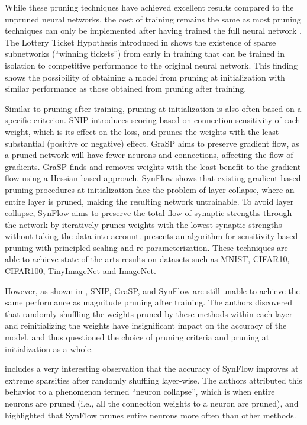 While these pruning techniques have achieved excellent results compared to the unpruned neural networks, the cost of training remains the same as most pruning techniques can only be implemented after having trained the full neural network \autocite{hayou21}. The Lottery Ticket Hypothesis introduced in \textcite{frankle19} shows the existence of sparse subnetworks (``winning tickets'') from early in training that can be trained in isolation to competitive performance to the original neural network. This finding shows the possibility of obtaining a model from pruning at initialization with similar performance as those obtained from pruning after training.

Similar to pruning after training, pruning at initialization is also often based on a specific criterion. SNIP \autocite{snip19} introduces scoring based on connection sensitivity of each weight, which is its effect on the loss, and prunes the weights with the least substantial (positive or negative) effect. GraSP \autocite{grasp20} aims to preserve gradient flow, as a pruned network will have fewer neurons and connections, affecting the flow of gradients. GraSP finds and removes weights with the least benefit to the gradient flow using a Hessian based approach. SynFlow \autocite{synflow20} shows that existing gradient-based pruning procedures at initialization face the problem of layer collapse, where an entire layer is pruned, making the resulting network untrainable. To avoid layer collapse, SynFlow aims to preserve the total flow of synaptic strengths through the network by iteratively prunes weights with the lowest synaptic strengths without taking the data into account. \textcite{hayou21} presents an algorithm for sensitivity-based pruning with principled scaling and re-parameterization. These techniques are able to achieve state-of-the-arts results on datasets such as MNIST, CIFAR10, CIFAR100, TinyImageNet and ImageNet.

However, as shown in \textcite{frankle21}, SNIP, GraSP, and SynFlow are still unable to achieve the same performance as magnitude pruning after training. The authors discovered that randomly shuffling the weights pruned by these methods within each layer and reinitializing the weights have insignificant impact on the accuracy of the model, and thus questioned the choice of pruning criteria and pruning at initialization as a whole.

\textcite{frankle21} includes a very interesting observation that the accuracy of SynFlow improves at extreme sparsities after randomly shuffling layer-wise. The authors attributed this behavior to a phenomenon termed ``neuron collapse'', which is when entire neurons are pruned (i.e., all the connection weights to a neuron are pruned), and highlighted that SynFlow prunes entire neurons more often than other methods.


